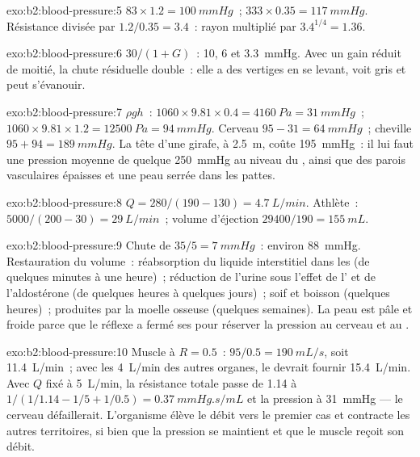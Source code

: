 \begin{solution}{exo:b2:blood-pressure:5}
$83\times 1.2 = \qty{100}{mmHg}$~; $333\times 0.35 = \qty{117}{mmHg}$.
Résistance divisée par $1.2/0.35 = 3.4$~: rayon multiplié par
$3.4^{1/4} =
1.36$.
\end{solution}

\begin{solution}{exo:b2:blood-pressure:6}
$30/(1 + G)$~: 10, 6 et \qty{3.3}{mmHg}. Avec un gain réduit de moitié,
la chute résiduelle double~: elle a des vertiges en se levant, voit gris
et peut s'évanouir.
\end{solution}

\begin{solution}{exo:b2:blood-pressure:7}
$\rho g h$~: $1060\times 9.81\times 0.4 = \qty{4160}{Pa} =
\qty{31}{mmHg}$~; $1060\times 9.81\times 1.2 = \qty{12500}{Pa} =
\qty{94}{mmHg}$. Cerveau $95 - 31 = \qty{64}{mmHg}$~; cheville
$95 + 94 =
\qty{189}{mmHg}$. La tête d'une girafe, à \qty{2.5}{m}, coûte
\qty{195}{mmHg}~: il lui faut une pression moyenne de quelque
\qty{250}{mmHg} au niveau du , ainsi que des parois vasculaires
épaisses et une peau serrée dans les pattes.
\end{solution}

\begin{solution}{exo:b2:blood-pressure:8}
$Q = 280/(190 - 130) = \qty{4.7}{L/min}$. Athlète~: $5000/(200 - 30) =
\qty{29}{L/min}$~; volume d'éjection $\num{29400}/190 = \qty{155}{mL}$.
\end{solution}

\begin{solution}{exo:b2:blood-pressure:9}
Chute de $35/5 = \qty{7}{mmHg}$~: environ \qty{88}{mmHg}. Restauration
du volume~: réabsorption du liquide interstitiel dans les 
(de quelques minutes à une heure)~; réduction de l'urine sous l'effet de
l' et de l'aldostérone (de quelques heures à
quelques jours)~; soif et boisson (quelques heures)~;  produites
par la moelle osseuse (quelques semaines). La peau est pâle et froide
parce que le réflexe a fermé ses  pour réserver la pression au
cerveau et au .
\end{solution}

\begin{solution}{exo:b2:blood-pressure:10}
Muscle à $R = 0.5$~: $95/0.5 = \qty{190}{mL/s}$, soit \qty{11.4}{L/min}~;
avec les \qty{4}{L/min} des autres organes, le  devrait fournir
\qty{15.4}{L/min}. Avec $Q$ fixé à \qty{5}{L/min}, la résistance totale
passe de 1.14 à $1/(1/1.14 - 1/5 + 1/0.5) =
\qty{0.37}{mmHg.s/mL}$ et la pression à \qty{31}{mmHg} --- le cerveau
défaillerait. L'organisme élève le débit vers le premier cas et contracte
les autres territoires, si bien que la pression se maintient et que le
muscle reçoit son débit.
\end{solution}

